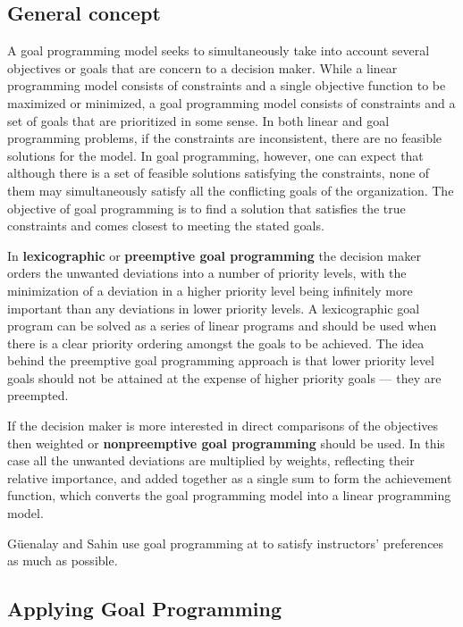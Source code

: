 \subsection{General concept}

A goal programming model seeks to simultaneously take into account several objectives or goals that are concern to a decision maker. While a linear programming model consists of constraints and a single objective function to be maximized or minimized, a goal programming model consists of constraints and a set of goals that are prioritized in some sense.
In both linear and goal programming problems, if the constraints are inconsistent, there are no feasible solutions for the model. In goal programming, however, one can expect that although there is a set of feasible solutions satisfying the constraints, none of them may simultaneously satisfy all the conflicting goals of the organization. The objective of goal programming is to find a solution that satisfies the true constraints and comes closest to meeting the stated goals.

In \textbf{lexicographic} or \textbf{preemptive goal programming} the decision maker orders the unwanted deviations into a number of priority levels, with the minimization of a deviation in a higher priority level being infinitely more important than any deviations in lower priority levels. A lexicographic goal program can be solved as a series of linear programs and should be used when there is a clear priority ordering amongst the goals to be achieved. The idea behind the preemptive goal programming approach is that lower priority level goals should not be attained at the expense of higher priority goals --- they are preempted.

If the decision maker is more interested in direct comparisons of the objectives then weighted or \textbf{nonpreemptive goal programming} should be used. In this case all the unwanted deviations are multiplied by weights, reflecting their relative importance, and added together as a single sum to form the achievement function, which converts the goal programming model into a linear programming model.

G\"{u}enalay and Sahin use goal programming at \cite{Guenalay2006} to satisfy instructors' preferences as much as possible.


\subsection{Applying Goal Programming}

